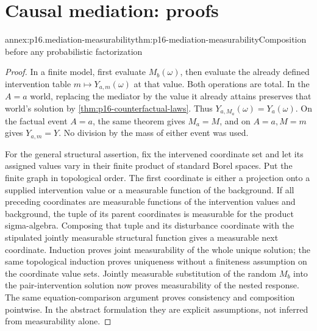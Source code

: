 \section{Causal mediation: proofs}
\label{sec:annex-p16-causal-mediation}

\begin{annexitem}{annex:p16.mediation-measurability}{thm:p16-mediation-measurability}{Composition before any probabilistic factorization}
\begin{proof}
In a finite model, first evaluate \(M_b(\omega)\), then evaluate the
already defined intervention table \(m\mapsto Y_{a,m}(\omega)\) at
that value. Both operations are total. In the \(A=a\) world, replacing
the mediator by the value it already attains preserves that world's
solution by \cref{thm:p16-counterfactual-laws}. Thus
\(Y_{a,M_a}(\omega)=Y_a(\omega)\). On the factual event \(A=a\),
the same theorem gives \(M_a=M\), and on \(A=a,M=m\) gives
\(Y_{a,m}=Y\). No division by the mass of either event was used.

For the general structural assertion, fix the intervened coordinate set
and let its assigned values vary in their finite product of standard
Borel spaces. Put the finite graph in topological order. The first
coordinate is either a projection onto a supplied intervention value or
a measurable function of the background. If all preceding coordinates
are measurable functions of the intervention values and background, the
tuple of its parent coordinates is measurable for the product sigma-algebra.
Composing that tuple and its disturbance coordinate with the stipulated
jointly measurable structural function gives a measurable next coordinate.
Induction proves joint measurability of the whole unique solution; the
same topological induction proves uniqueness without a finiteness
assumption on the coordinate value sets. Jointly measurable substitution
of the random \(M_b\) into the pair-intervention solution now proves
measurability of the nested response. The same equation-comparison
argument proves consistency and composition pointwise. In the abstract
formulation they are explicit assumptions, not inferred from
measurability alone.
\end{proof}
\end{annexitem}

